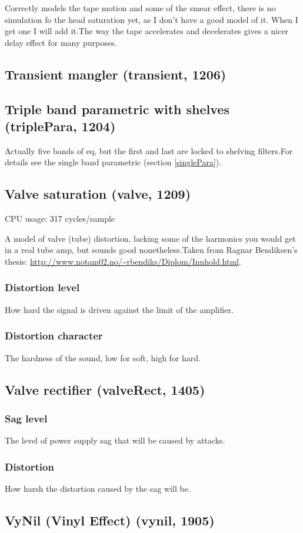 \documentclass[11pt]{article}
\begin{document}
Correctly models the tape motion and some of the smear effect, there is no simulation fo the head saturation yet, as I don't have a good model of it. When I get one I will add it.The way the tape accelerates and decelerates gives a nicer delay effect for many purposes.\subsection{Transient mangler (transient, 1206)\label{transient}\label{id1206}}
\subsection{Triple band parametric with shelves (triplePara, 1204)\label{triplePara}\label{id1204}}
Actually five bands of eq, but the first and last are locked to shelving filters.For details see the single band parametric (section \ref{singlePara}).\subsection{Valve saturation (valve, 1209)\label{valve}\label{id1209}}
CPU usage: 317 cycles/sample

A model of valve (tube) distortion, lacking some of the harmonics you would get in a real tube amp, but sounds good nonetheless.Taken from Ragnar Bendiksen's thesis: \url{http://www.notam02.no/~rbendiks/Diplom/Innhold.html}.\subsubsection*{Distortion level}
How hard the signal is driven against the limit of the amplifier.\subsubsection*{Distortion character}
The hardness of the sound, low for soft, high for hard.\subsection{Valve rectifier (valveRect, 1405)\label{valveRect}\label{id1405}}
\subsubsection*{Sag level}
The level of power supply sag that will be caused by attacks.\subsubsection*{Distortion}
How harsh the distortion caused by the sag will be.\subsection{VyNil (Vinyl Effect) (vynil, 1905)\label{vynil}\label{id1905}}
\end{document}
